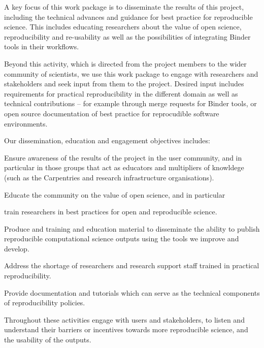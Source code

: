 \begin{workpackage}[id=education,wphases=0-36!0.97,
  title={Dissemination, education and engagement},
  short={Dissemination, education, and engagement},
  lead=IFR,
  IFRRM=10,
  MPRM=6,
  SRLRM=7,
  QSRM=3,
  UIORM=9,
  swsites
]


\begin{wpobjectives}
  A key focus of this work package is to disseminate the results of this
  project, including the technical advances and guidance for best practice for
  reproducible science. This includes educating researchers about the value of
  open science, reproducibility and re-usability as well as the possibilities of
  integrating Binder tools in their workflows.

  Beyond this activity, which is directed from the project members to the wider community of
  scientists, we use this work package to engage with researchers and
  stakeholders and seek input from them to the project. Desired input includes
  requirements for practical reproducibility in the different domain as well as
  technical contributions -- for example through merge requests for Binder
  tools, or open source documentation of best practice for reprocudible software
  environments.

  Our dissemination, education and engagement objectives includes:
 \begin{compactitem}
   \item Ensure awareness of the results of the project in the user community,
     and in particular in those groups that act as educators and multipliers of
     knowldege (such as the Carpentries and research infrastructure organisations).
   \item Educate the community on the value of open science, and in particular
   \item train researchers in best practices for open and reproducible science.
   \item Produce and training and education material to disseminate the ability to
     publish reproducible computational science outputs using the tools we
     improve and develop.
   \item Address the shortage of researchers and research support staff trained
     in practical reproducibility.
   \item Provide documentation and tutorials which can serve as the technical
     components of reproducibility policies.
   \item Throughout these activities engage with users and stakeholders, to
     listen and understand their barriers or incentives towards more
     reproducible science, and the usability of the \TheProject outputs.
 \end{compactitem}
\end{wpobjectives}


\end{workpackage}

